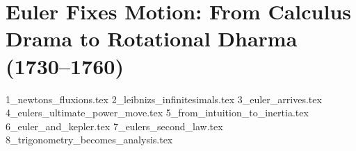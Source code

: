 \section{Euler Fixes Motion: From Calculus Drama to Rotational Dharma (1730–1760)}

{1_newtons_fluxions.tex}
{2_leibnizs_infinitesimals.tex}
{3_euler_arrives.tex}
{4_eulers_ultimate_power_move.tex}
{5_from_intuition_to_inertia.tex}
{6_euler_and_kepler.tex}
{7_eulers_second_law.tex}
{8_trigonometry_becomes_analysis.tex}

